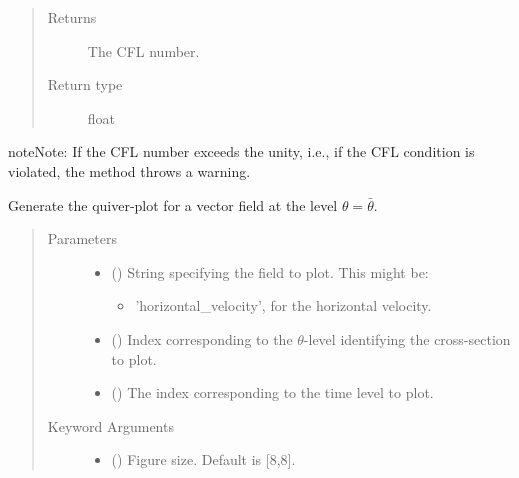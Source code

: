 \documentclass[letterpaper,10pt,english]{sphinxmanual}
\begin{document}
\begin{fulllineitems}
\begin{fulllineitems}
\begin{quote}
\begin{description}
\item[{Returns}] \leavevmode
The CFL number.

\item[{Return type}] \leavevmode
float

\end{description}\end{quote}

\begin{sphinxadmonition}{note}{Note:}
If the CFL number exceeds the unity, i.e., if the CFL condition is violated, the method throws a warning.
\end{sphinxadmonition}

\end{fulllineitems}


\begin{fulllineitems}
\label{\detokenize{api:storages.state_isentropic.StateIsentropic.quiver_xy}}
Generate the quiver-plot for a vector field at the level \(\theta = \bar{\theta}\).
\begin{quote}\begin{description}
\item[{Parameters}] \leavevmode\begin{itemize}
\item {} 
 () \textendash{} 
String specifying the field to plot. This might be:
\begin{itemize}
\item {} 
’horizontal\_velocity’, for the horizontal velocity.

\end{itemize}


\item {} 
 () \textendash{} Index corresponding to the \(\theta\)-level identifying the cross-section to plot.

\item {} 
 () \textendash{} The index corresponding to the time level to plot.

\end{itemize}

\item[{Keyword Arguments}] \leavevmode\begin{itemize}
\item {} 
 () \textendash{} Figure size. Default is {[}8,8{]}.


\end{itemize}
\end{description}
\end{quote}
\end{fulllineitems}
\end{fulllineitems}
\end{document}
